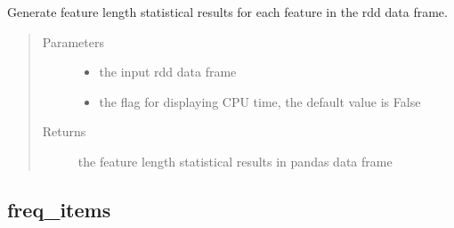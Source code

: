 \documentclass[letterpaper,12pt,english]{sphinxmanual}
\begin{document}
\begin{fulllineitems}
Generate feature length statistical results for each feature in the rdd data frame.
\begin{quote}\begin{description}
\item[{Parameters}] \leavevmode\begin{itemize}
\item {} 
 \textendash{} the input rdd data frame

\item {} 
 \textendash{} the flag for displaying CPU time, the default value is False

\end{itemize}

\item[{Returns}] \leavevmode
the feature length statistical results in pandas data frame

\end{description}\end{quote}

\end{fulllineitems}



\subsection{freq\_items}
\label{\detokenize{basics:freq-items}}
\end{document}
